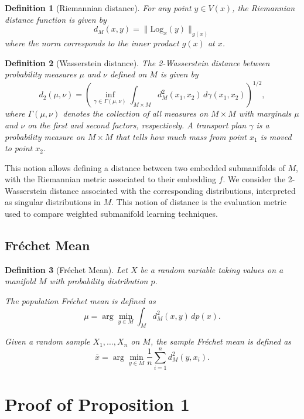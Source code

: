 \documentclass{article}
\newtheorem{definition}{Definition}
\begin{document}
\begin{definition}[Riemannian distance]
For any point $y \in V(x)$, the Riemannian distance function is given by
\[
    d_M(x, y) = \| \mathrm{Log}_x(y) \|_{g(x)}
\]
where the norm corresponds to the inner product $g(x)$ at $x$.
\end{definition}

\begin{definition}[Wasserstein distance]
The 2-Wasserstein distance between probability measures $\mu$ and $\nu$ defined on $M$ is given by
\[
    d_2(\mu, \nu) =
    \left(
        \inf_{\gamma \in \Gamma(\mu, \nu)}
        \int_{M \times M}
        d_M^2(x_1, x_2) \, d\gamma(x_1, x_2)
    \right)^{1/2},
\]
where $\Gamma(\mu, \nu)$ denotes the collection of all measures on $M \times M$ with marginals $\mu$ and $\nu$ on the first and second factors, respectively. A transport plan $\gamma$ is a probability measure on $M \times M$ that tells how much mass from point $x_1$ is moved to point $x_2$.
\end{definition}

This notion allows defining a distance between two embedded submanifolds of $M$, with the Riemannian metric associated to their embedding $f$. We consider the 2-Wasserstein distance associated with the corresponding distributions, interpreted as singular distributions in $M$. This notion of distance is the evaluation metric used to compare weighted submanifold learning techniques.


\subsection{Fr\'echet Mean}

\begin{definition}[Fr\'echet Mean]
Let $X$ be a random variable taking values on a manifold $M$ with probability distribution $p$.

The \emph{population Fr\'echet mean} is defined as
\[
\mu = \arg\min_{y \in M} \int_M d_M^2(x,y) \, dp(x).
\]

Given a random sample $X_1,\dots,X_n$ on $M$, the \emph{sample Fr\'echet mean} is defined as
\[
\bar x = \arg\min_{y \in M} \frac{1}{n} \sum_{i=1}^n d_M^2(y, x_i).
\]
\end{definition}

\section{Proof of Proposition 1}
\end{document}

